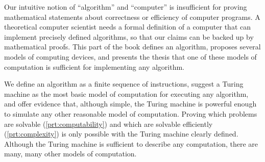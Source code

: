 Our intuitive notion of ``algorithm'' and ``computer'' is insufficient for proving mathematical statements about correctness or efficiency of computer programs.
A theoretical computer scientist needs a formal definition of a computer that can implement precisely defined algorithms, so that our claims can be backed up by mathematical proofs.
This part of the book defines an algorithm, proposes several models of computing devices, and presents the thesis that one of these models of computation is sufficient for implementing any algorithm.

We define an algorithm as a finite sequence of instructions, suggest a Turing machine as the most basic model of computation for executing any algorithm, and offer evidence that, although simple, the Turing machine is powerful enough to simulate any other reasonable model of computation.
Proving which problems are solvable (\autoref{prt:computability}) and which are solvable efficiently (\autoref{prt:complexity}) is only possible with the Turing machine clearly defined.
Although the Turing machine is sufficient to describe any computation, there are many, many other models of computation.
